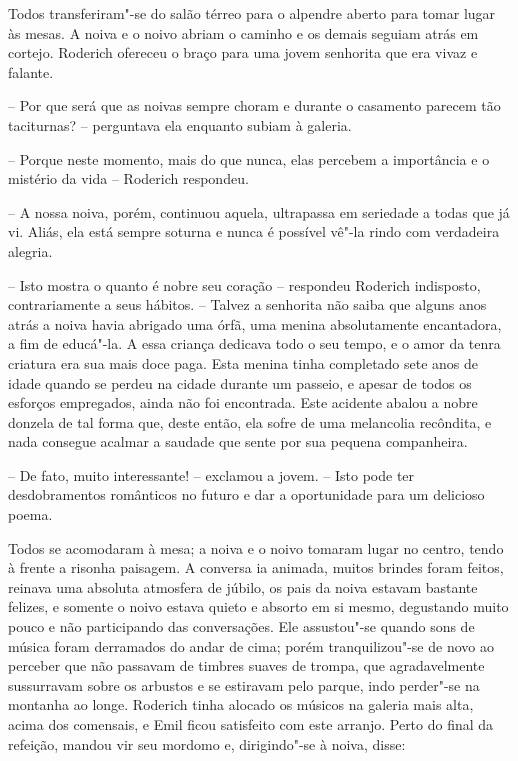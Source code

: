 Todos transferiram"-se do salão térreo para o alpendre aberto para tomar
lugar às mesas. A noiva e o noivo abriam o caminho e os demais seguiam
atrás em cortejo. Roderich ofereceu o braço para uma jovem senhorita
que era vivaz e falante.

-- Por que será que as noivas sempre choram e durante o casamento
parecem tão taciturnas? -- perguntava ela enquanto subiam à galeria.

-- Porque neste momento, mais do que nunca, elas percebem a
importância e o mistério da vida -- Roderich respondeu.

-- A nossa noiva, porém, continuou aquela, ultrapassa em seriedade
a todas que já vi. Aliás, ela está sempre soturna e nunca é possível
vê"-la rindo com verdadeira alegria.

-- Isto mostra o quanto é nobre seu coração -- respondeu Roderich
indisposto, contrariamente a seus hábitos. -- Talvez a senhorita não saiba
que alguns anos atrás a noiva havia abrigado uma órfã, uma menina
absolutamente encantadora, a fim de educá"-la. A essa criança dedicava
todo o seu tempo, e o amor da tenra criatura era sua mais doce paga.
Esta menina tinha completado sete anos de idade quando se perdeu na
cidade durante um passeio, e apesar de todos os esforços empregados,
ainda não foi encontrada. Este acidente abalou a nobre donzela de tal
forma que, deste então, ela sofre de uma melancolia recôndita, e nada
consegue acalmar a saudade que sente por sua pequena companheira.

-- De fato, muito interessante! -- exclamou a jovem. -- Isto pode ter
desdobramentos românticos no futuro e dar a oportunidade para um
delicioso poema.
 
Todos se acomodaram à mesa; a noiva e o noivo tomaram lugar no centro,
tendo à frente a risonha paisagem. A conversa ia animada, muitos
brindes foram feitos, reinava uma absoluta atmosfera de júbilo, os pais
da noiva estavam bastante felizes, e somente o noivo estava quieto e
absorto em si mesmo, degustando muito pouco e não participando das
conversações. Ele assustou"-se quando sons de música foram derramados do
andar de cima; porém tranquilizou"-se de novo ao perceber que não
passavam de timbres suaves de trompa, que agradavelmente sussurravam sobre
os arbustos e se estiravam pelo parque, indo perder"-se na montanha ao
longe. Roderich tinha alocado os músicos na galeria mais alta, acima
dos comensais, e Emil ficou satisfeito com este arranjo. Perto do final
da refeição, mandou vir seu mordomo e, dirigindo"-se à noiva, disse: 

